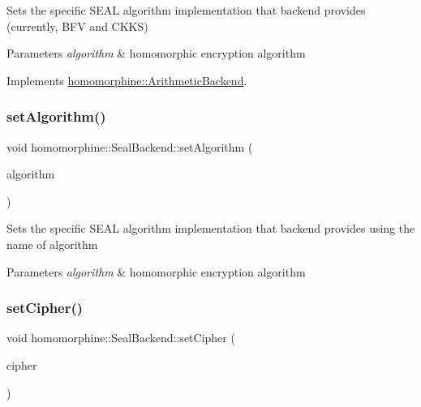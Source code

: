 Sets the specific S\+E\+AL algorithm implementation that backend provides (currently, B\+FV and C\+K\+KS)


\begin{DoxyParams}{Parameters}
{\em algorithm} & homomorphic encryption algorithm \\
\hline
\end{DoxyParams}


Implements \hyperlink{classhomomorphine_1_1_arithmetic_backend_ac53135f4f66a2f7a33d3c6e6d465b86f}{homomorphine\+::\+Arithmetic\+Backend}.

\mbox{\label{classhomomorphine_1_1_seal_backend_aaf2100eb13b4434bc0136ff00578bb8d}} 
\subsubsection{\texorpdfstring{set\+Algorithm()}{setAlgorithm()}\hspace{0.1cm}{\footnotesize\ttfamily [2/2]}}
{\footnotesize\ttfamily void homomorphine\+::\+Seal\+Backend\+::set\+Algorithm (\begin{DoxyParamCaption}\item[{Seal\+Algorithm}]{algorithm }\end{DoxyParamCaption})}

Sets the specific S\+E\+AL algorithm implementation that backend provides using the name of algorithm


\begin{DoxyParams}{Parameters}
{\em algorithm} & homomorphic encryption algorithm \\
\hline
\end{DoxyParams}
\mbox{\label{classhomomorphine_1_1_seal_backend_a866b58e41809d68d4c6ed8c3afb27712}} 
\subsubsection{\texorpdfstring{set\+Cipher()}{setCipher()}}
{\footnotesize\ttfamily void homomorphine\+::\+Seal\+Backend\+::set\+Cipher (\begin{DoxyParamCaption}\item[{string}]{cipher }\end{DoxyParamCaption})\hspace{0.3cm}{\ttfamily [virtual]}}

